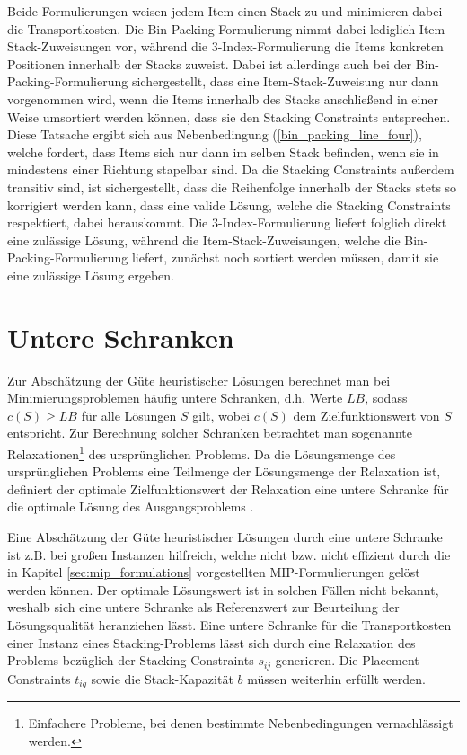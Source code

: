 Beide Formulierungen weisen jedem Item einen Stack zu und minimieren dabei die Transportkosten.
Die Bin-Packing-Formulierung nimmt dabei lediglich Item-Stack-Zuweisungen vor, während die 3-Index-Formulierung die
Items konkreten Positionen innerhalb der Stacks zuweist. Dabei ist allerdings auch bei der Bin-Packing-Formulierung
sichergestellt, dass eine Item-Stack-Zuweisung nur dann vorgenommen wird, wenn die Items innerhalb des Stacks anschließend
in einer Weise umsortiert werden können, dass sie den Stacking Constraints entsprechen. Diese Tatsache ergibt sich aus Nebenbedingung (\ref{bin_packing_line_four}), welche fordert, dass Items sich nur dann im selben Stack befinden, wenn sie in mindestens einer Richtung stapelbar sind.
Da die Stacking Constraints außerdem transitiv sind, ist sichergestellt, dass die Reihenfolge innerhalb der Stacks stets so korrigiert werden kann, dass eine valide Lösung, welche die Stacking Constraints respektiert, dabei herauskommt.
Die 3-Index-Formulierung liefert folglich direkt eine zulässige Lösung, während die Item-Stack-Zuweisungen, welche die Bin-Packing-Formulierung liefert, zunächst noch sortiert werden müssen, damit sie eine zulässige Lösung ergeben.

\vfill
\pagebreak

\section{Untere Schranken}
\label{sec:lower_bounds}

Zur Abschätzung der Güte heuristischer Lösungen berechnet man bei Minimierungsproblemen häufig untere Schranken,
d.h. Werte $LB$, sodass $c(S) \geq LB$ für alle Lösungen $S$ gilt, wobei $c(S)$ dem Zielfunktionswert von $S$ entspricht.
Zur Berechnung solcher Schranken betrachtet man sogenannte Relaxationen\footnote{Einfachere Probleme, bei denen bestimmte Nebenbedingungen vernachlässigt werden.} des ursprünglichen Problems.
Da die Lösungsmenge des ursprünglichen Problems eine Teilmenge der Lösungsmenge der Relaxation ist,
definiert der optimale Zielfunktionswert der Relaxation eine untere Schranke für die optimale Lösung des Ausgangsproblems
\cite{Knust2017}.

Eine Abschätzung der Güte heuristischer Lösungen durch eine untere Schranke ist z.B. bei großen Instanzen hilfreich,
welche nicht bzw. nicht effizient durch die in Kapitel \ref{sec:mip_formulations} vorgestellten MIP-Formulierungen gelöst werden können.
Der optimale Lösungswert ist in solchen Fällen nicht bekannt, weshalb sich eine untere Schranke als Referenzwert
zur Beurteilung der Lösungsqualität heranziehen lässt. Eine untere Schranke für die Transportkosten einer Instanz eines Stacking-Problems lässt sich durch eine Relaxation des Problems bezüglich der Stacking-Constraints $s_{ij}$ generieren.
Die Placement-Constraints $t_{iq}$ sowie die Stack-Kapazität $b$ müssen weiterhin erfüllt werden.

